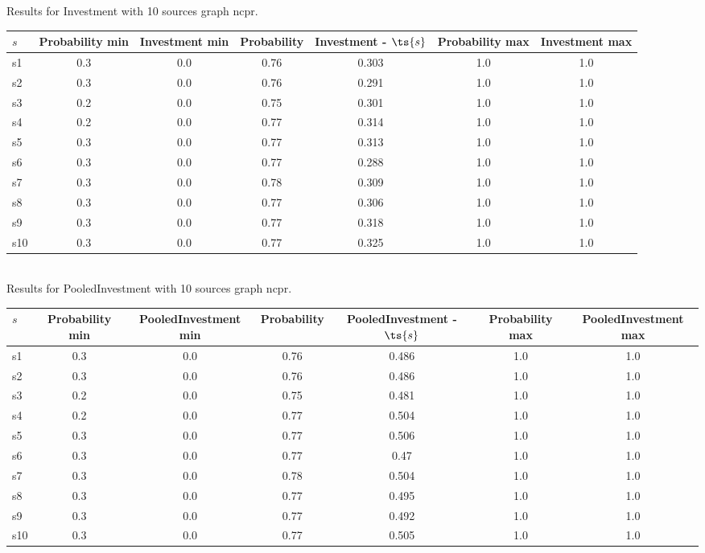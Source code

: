 \documentclass{article}
\begin{document}
\noindent Results for Investment with 10 sources graph ncpr.

\noindent\begin{tabular}{|l|c|c|c|c|c|c|}
\hline
$s$& Probability min & Investment min & Probability & Investment - $\ts{s}$ & Probability max & Investment max\\
\hline
s1 &0.3 & 0.0 & 0.76 & 0.303 & 1.0 & 1.0\\
\hline
s2 &0.3 & 0.0 & 0.76 & 0.291 & 1.0 & 1.0\\
\hline
s3 &0.2 & 0.0 & 0.75 & 0.301 & 1.0 & 1.0\\
\hline
s4 &0.2 & 0.0 & 0.77 & 0.314 & 1.0 & 1.0\\
\hline
s5 &0.3 & 0.0 & 0.77 & 0.313 & 1.0 & 1.0\\
\hline
s6 &0.3 & 0.0 & 0.77 & 0.288 & 1.0 & 1.0\\
\hline
s7 &0.3 & 0.0 & 0.78 & 0.309 & 1.0 & 1.0\\
\hline
s8 &0.3 & 0.0 & 0.77 & 0.306 & 1.0 & 1.0\\
\hline
s9 &0.3 & 0.0 & 0.77 & 0.318 & 1.0 & 1.0\\
\hline
s10 &0.3 & 0.0 & 0.77 & 0.325 & 1.0 & 1.0\\
\hline
\end{tabular}\\

\noindent Results for PooledInvestment with 10 sources graph ncpr.

\noindent\begin{tabular}{|l|c|c|c|c|c|c|}
\hline
$s$& Probability min & PooledInvestment min & Probability & PooledInvestment - $\ts{s}$ & Probability max & PooledInvestment max\\
\hline
s1 &0.3 & 0.0 & 0.76 & 0.486 & 1.0 & 1.0\\
\hline
s2 &0.3 & 0.0 & 0.76 & 0.486 & 1.0 & 1.0\\
\hline
s3 &0.2 & 0.0 & 0.75 & 0.481 & 1.0 & 1.0\\
\hline
s4 &0.2 & 0.0 & 0.77 & 0.504 & 1.0 & 1.0\\
\hline
s5 &0.3 & 0.0 & 0.77 & 0.506 & 1.0 & 1.0\\
\hline
s6 &0.3 & 0.0 & 0.77 & 0.47 & 1.0 & 1.0\\
\hline
s7 &0.3 & 0.0 & 0.78 & 0.504 & 1.0 & 1.0\\
\hline
s8 &0.3 & 0.0 & 0.77 & 0.495 & 1.0 & 1.0\\
\hline
s9 &0.3 & 0.0 & 0.77 & 0.492 & 1.0 & 1.0\\
\hline
s10 &0.3 & 0.0 & 0.77 & 0.505 & 1.0 & 1.0\\
\hline
\end{tabular}\\
\end{document}
